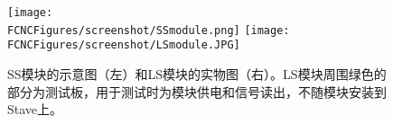 
\begin{figure}[H]
\centering
\texttt{[image: \\FCNCFigures/screenshot/SSmodule.png]}
\texttt{[image: \\FCNCFigures/screenshot/LSmodule.JPG]}\\
\caption{SS模块的示意图（左）和LS模块的实物图（右）。LS模块周围绿色的部分为测试板，用于测试时为模块供电和信号读出，不随模块安装到Stave上。}
\label{fig:module}
\end{figure}